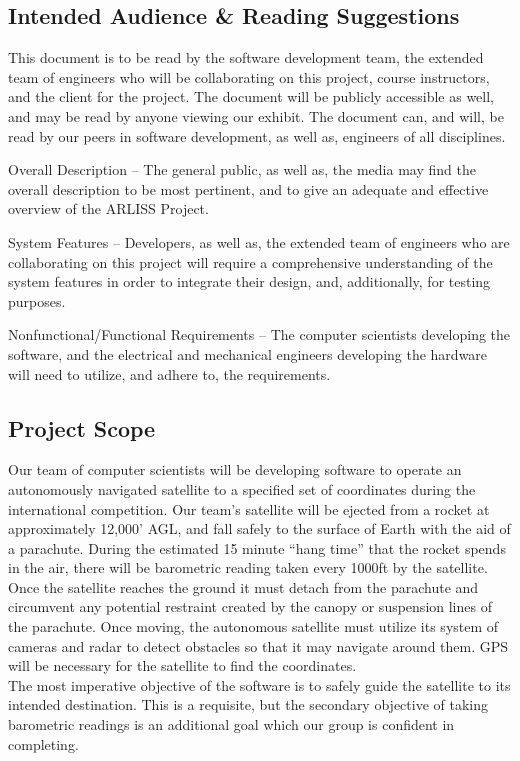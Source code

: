 \documentclass[10pt,onecolumn,draftclsnofoot,document]{IEEEtran}
\newenvironment{hangingpar}[1]
{\begin{list}
          {}{
		\setlength{\itemindent}{-#1}
           	\setlength{\leftmargin}{#1}
           	\setlength{\itemsep}{0pt}
           	\setlength{\parsep}{\parskip}
           	\setlength{\topsep}{\parskip}
           }
    	\setlength{\parindent}{-#1}%
    	\item[]
}
{\end{list}}
\begin{document}
\subsection{Intended Audience \& Reading Suggestions}
This document is to be read by the software development team, the extended team of engineers who will be collaborating on this project, course instructors, and the client for the project. The document will be publicly accessible as well, and may be read by anyone viewing our exhibit. The document can, and will, be read by our peers in software development, as well as, engineers of all disciplines.\\ 
\begin{hangingpar}{3em}{}
 Overall Description – The general public, as well as, the media may find the overall description to be most pertinent, and to give an adequate and effective overview of the ARLISS Project.\\
\par
 System Features – Developers, as well as, the extended team of engineers who are collaborating on this project will require a comprehensive understanding of the system features in order to integrate their design, and, additionally, for testing purposes.\\
\par
 Nonfunctional/Functional Requirements – The computer scientists developing the software, and the electrical and mechanical engineers developing the hardware will need to utilize, and adhere to, the requirements.
\end{hangingpar}
\subsection{Project Scope}
Our team of computer scientists will be developing software to operate an autonomously navigated satellite to a specified set of coordinates during the international competition. Our team’s satellite will be ejected from a rocket at approximately 12,000’ AGL, and fall safely to the surface of Earth with the aid of a parachute. During the estimated 15 minute “hang time” that the rocket spends in the air, there will be barometric reading taken every 1000ft by the satellite. Once the satellite reaches the ground it must detach from the parachute and circumvent any potential restraint created by the canopy or suspension lines of the parachute. Once moving, the autonomous satellite must utilize its system of cameras and radar to detect obstacles so that it may navigate around them. GPS will be necessary for the satellite to find the coordinates.
\\
The most imperative objective of the software is to safely guide the satellite to its intended destination. This is a requisite, but the secondary objective of taking barometric readings is an additional goal which our group is confident in completing.
\end{document}
